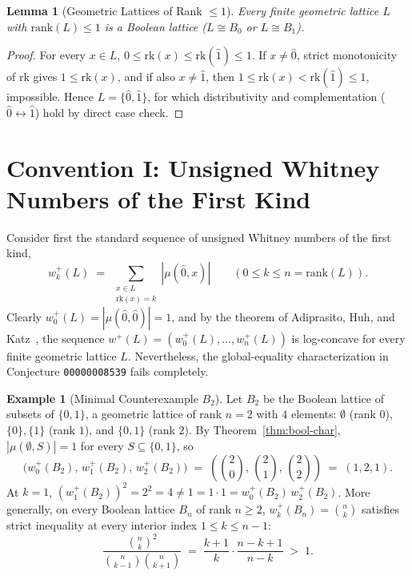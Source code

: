 \documentclass[11pt]{article}
\newtheorem{lemma}[theorem]{Lemma}
\theoremstyle{definition}
\newtheorem{example}[theorem]{Example}
\theoremstyle{remark}
\newcommand{\rk}{\mathrm{rk}}
\newcommand{\hatzero}{\hat{0}}
\newcommand{\hatone}{\hat{1}}
\begin{document}
\begin{lemma}[Geometric Lattices of Rank $\le 1$]
\label{lem:rk1-bool}
Every finite geometric lattice $L$ with $\mathrm{rank}(L) \le 1$ is a Boolean lattice ($L \cong B_0$ or $L \cong B_1$).
\end{lemma}

\begin{proof}
For every $x \in L$, $0 \le \rk(x) \le \rk(\hatone) \le 1$. If $x \neq \hatzero$, strict monotonicity of $\rk$ gives $1 \le \rk(x)$, and if also $x \neq \hatone$, then $1 \le \rk(x) < \rk(\hatone) \le 1$, impossible. Hence $L = \{\hatzero, \hatone\}$, for which distributivity and complementation ($\hatzero \leftrightarrow \hatone$) hold by direct case check.
\end{proof}

\section{Convention I: Unsigned Whitney Numbers of the First Kind}

Consider first the standard sequence of unsigned Whitney numbers of the first kind,
\[
  w_k^+(L) \;=\; \sum_{\substack{x \in L \\ \rk(x)=k}} |\mu(\hatzero, x)| \qquad (0 \le k \le n = \mathrm{rank}(L)).
\]
Clearly $w_0^+(L) = |\mu(\hatzero, \hatzero)| = 1$, and by the theorem of Adiprasito, Huh, and Katz~\cite{AHK2018}, the sequence $w^+(L) = (w_0^+(L), \dots, w_n^+(L))$ is log-concave for every finite geometric lattice $L$. Nevertheless, the global-equality characterization in Conjecture \texttt{00000008539} fails completely.

\begin{example}[Minimal Counterexample $B_2$]
\label{ex:b2}
Let $B_2$ be the Boolean lattice of subsets of $\{0, 1\}$, a geometric lattice of rank $n = 2$ with $4$ elements: $\emptyset$ (rank $0$), $\{0\}, \{1\}$ (rank $1$), and $\{0, 1\}$ (rank $2$). By Theorem~\ref{thm:bool-char}, $|\mu(\emptyset, S)| = 1$ for every $S \subseteq \{0, 1\}$, so
\[
  \bigl(w_0^+(B_2),\, w_1^+(B_2),\, w_2^+(B_2)\bigr) \;=\; \left(\binom{2}{0},\, \binom{2}{1},\, \binom{2}{2}\right) \;=\; (1, 2, 1).
\]
At $k = 1$, $(w_1^+(B_2))^2 = 2^2 = 4 \neq 1 = 1 \cdot 1 = w_0^+(B_2)\,w_2^+(B_2)$. More generally, on every Boolean lattice $B_n$ of rank $n \ge 2$, $w_k^+(B_n) = \binom{n}{k}$ satisfies strict inequality at every interior index $1 \le k \le n - 1$:
\[
  \frac{\binom{n}{k}^2}{\binom{n}{k-1}\binom{n}{k+1}} \;=\; \frac{k + 1}{k} \cdot \frac{n - k + 1}{n - k} \;>\; 1.
\]
\end{example}
\end{document}
